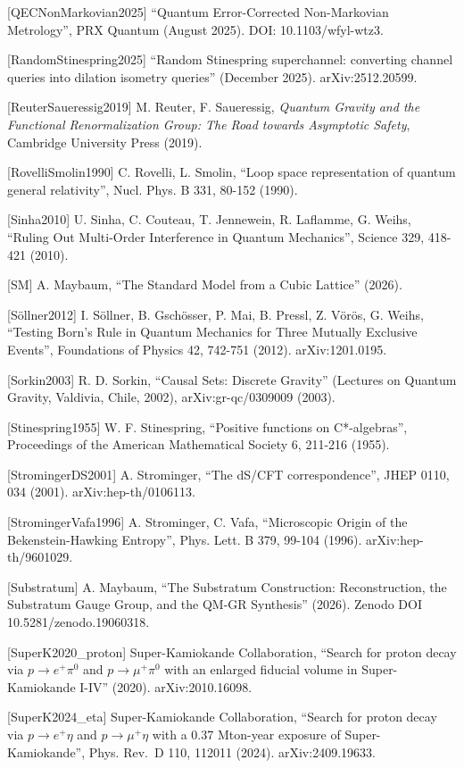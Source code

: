 \documentclass[
]{article}
\begin{document}
{[}QECNonMarkovian2025{]} ``Quantum Error-Corrected Non-Markovian
Metrology'', PRX Quantum (August 2025). DOI: 10.1103/wfyl-wtz3.

{[}RandomStinespring2025{]} ``Random Stinespring superchannel:
converting channel queries into dilation isometry queries'' (December
2025). arXiv:2512.20599.

{[}ReuterSaueressig2019{]} M. Reuter, F. Saueressig, \emph{Quantum
Gravity and the Functional Renormalization Group: The Road towards
Asymptotic Safety}, Cambridge University Press (2019).

{[}RovelliSmolin1990{]} C. Rovelli, L. Smolin, ``Loop space
representation of quantum general relativity'', Nucl. Phys. B 331,
80-152 (1990).

{[}Sinha2010{]} U. Sinha, C. Couteau, T. Jennewein, R. Laflamme, G.
Weihs, ``Ruling Out Multi-Order Interference in Quantum Mechanics'',
Science 329, 418-421 (2010).

{[}SM{]} A. Maybaum, ``The Standard Model from a Cubic Lattice'' (2026).

{[}Söllner2012{]} I. Söllner, B. Gschösser, P. Mai, B. Pressl, Z. Vörös,
G. Weihs, ``Testing Born's Rule in Quantum Mechanics for Three Mutually
Exclusive Events'', Foundations of Physics 42, 742-751 (2012).
arXiv:1201.0195.

{[}Sorkin2003{]} R. D. Sorkin, ``Causal Sets: Discrete Gravity''
(Lectures on Quantum Gravity, Valdivia, Chile, 2002),
arXiv:gr-qc/0309009 (2003).

{[}Stinespring1955{]} W. F. Stinespring, ``Positive functions on
C*-algebras'', Proceedings of the American Mathematical Society 6,
211-216 (1955).

{[}StromingerDS2001{]} A. Strominger, ``The dS/CFT correspondence'',
JHEP 0110, 034 (2001). arXiv:hep-th/0106113.

{[}StromingerVafa1996{]} A. Strominger, C. Vafa, ``Microscopic Origin of
the Bekenstein-Hawking Entropy'', Phys. Lett. B 379, 99-104 (1996).
arXiv:hep-th/9601029.

{[}Substratum{]} A. Maybaum, ``The Substratum Construction:
Reconstruction, the Substratum Gauge Group, and the QM-GR Synthesis''
(2026). Zenodo DOI 10.5281/zenodo.19060318.

{[}SuperK2020\_proton{]} Super-Kamiokande Collaboration, ``Search for
proton decay via \(p \to e^+\pi^0\) and \(p \to \mu^+\pi^0\) with an
enlarged fiducial volume in Super-Kamiokande I-IV'' (2020).
arXiv:2010.16098.

{[}SuperK2024\_eta{]} Super-Kamiokande Collaboration, ``Search for
proton decay via \(p \to e^+\eta\) and \(p \to \mu^+\eta\) with a 0.37
Mton-year exposure of Super-Kamiokande'', Phys. Rev.~D 110, 112011
(2024). arXiv:2409.19633.
\end{document}
